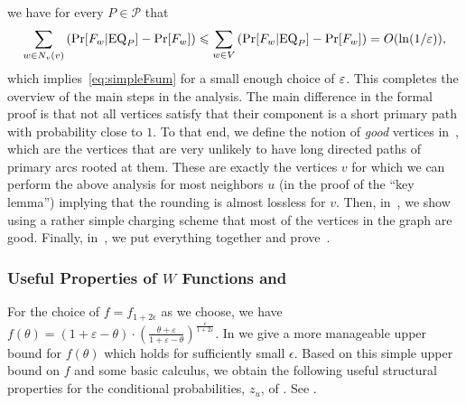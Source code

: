 we have for every $P\in \mathcal{P}$ that
\begin{align*}
  \sum_{w \in N_v(v)}\left(\Pr[F_w|\mathrm{EQ}_{P}] - \Pr[F_w]\right) \leqslant \sum_{w \in V}\left(\Pr[F_w|\mathrm{EQ}_{P}] - \Pr[F_w]\right) = O(\ln(1/\varepsilon)),
\end{align*}
which implies~\eqref{eq:simpleFsum} for a small enough choice of $\varepsilon$. This completes the overview of the main steps in the analysis. The main difference in the formal proof is that not all vertices satisfy that their component is a short primary path  with probability close to $1$. To that end, we define the notion of \emph{good} vertices in~, which are the vertices that are very unlikely 
to have long directed paths of primary arcs rooted at them. These are exactly the vertices $v$ for which we can perform the above analysis for most neighbors $u$ (in the proof of the ``key lemma'') implying that the rounding is almost lossless for $v$. Then, in~, we show using a rather simple charging scheme that most of the vertices in the graph are good. Finally, in~, we put everything together and prove~.


\subsubsection{Useful Properties of \texorpdfstring{$W$}{W} Functions and }
\label{sec:propertiesWW}
For the choice of $f=f_{1+2\epsilon}$ as we choose, we have $f(\theta) = \left(1+ \varepsilon - \theta\right) \cdot \left(\frac{\theta+\varepsilon}{1+\varepsilon-\theta}
\right)^{\frac{\varepsilon}{1+2\varepsilon}}$. In  we give a more manageable upper bound for $f(\theta)$ which holds for sufficiently small $\epsilon$. Based on this simple upper bound on $f$ and some basic calculus, we obtain the following useful structural properties for the conditional probabilities, $z_u$, of . See .


